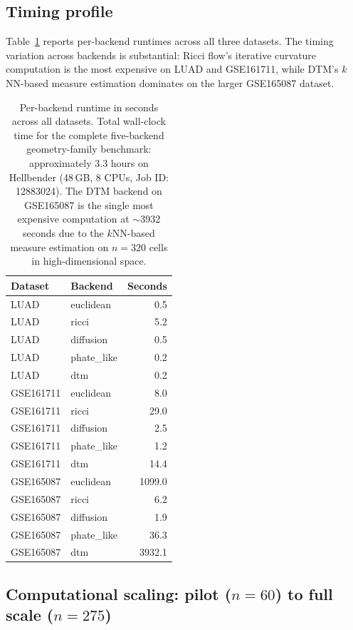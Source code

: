 \documentclass[11pt]{article}
\begin{document}
\subsection{Timing profile}

Table~\ref{tab:timing} reports per-backend runtimes across all three datasets.
The timing variation across backends is substantial: Ricci flow's iterative curvature computation is the most expensive on LUAD and GSE161711, while DTM's $k$NN-based measure estimation dominates on the larger GSE165087 dataset.

\begin{table}[h]
\centering
\small
\begin{tabular}{llr}
\toprule
Dataset & Backend & Seconds \\
\midrule
LUAD & euclidean & 0.5 \\
LUAD & ricci & 5.2 \\
LUAD & diffusion & 0.5 \\
LUAD & phate\_like & 0.2 \\
LUAD & dtm & 0.2 \\
\midrule
GSE161711 & euclidean & 8.0 \\
GSE161711 & ricci & 29.0 \\
GSE161711 & diffusion & 2.5 \\
GSE161711 & phate\_like & 1.2 \\
GSE161711 & dtm & 14.4 \\
\midrule
GSE165087 & euclidean & 1099.0 \\
GSE165087 & ricci & 6.2 \\
GSE165087 & diffusion & 1.9 \\
GSE165087 & phate\_like & 36.3 \\
GSE165087 & dtm & 3932.1 \\
\bottomrule
\end{tabular}
\caption{Per-backend runtime in seconds across all datasets.
Total wall-clock time for the complete five-backend geometry-family benchmark: approximately 3.3 hours on Hellbender (48\,GB, 8 CPUs, Job ID: 12883024).
The DTM backend on GSE165087 is the single most expensive computation at ${\sim}$3932 seconds due to the $k$NN-based measure estimation on $n = 320$ cells in high-dimensional space.}
\label{tab:timing}
\end{table}

\subsection{Computational scaling: pilot ($n = 60$) to full scale ($n = 275$)}
\end{document}
